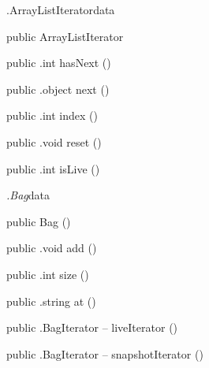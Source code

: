 \begin{CrexxClass}{.ArrayListIterator}{data}

  \begin{Hierarchy}
  \end{Hierarchy}

  \begin{Members}

    \Factory
      {public}
      {ArrayListIterator}
      {}

    \Method
      {public}
      {.int}
      {hasNext}
      {()}

    \Method
      {public}
      {.object}
      {next}
      {()}

    \Method
      {public}
      {.int}
      {index}
      {()}

    \Method
      {public}
      {.void}
      {reset}
      {()}

    \Method
      {public}
      {.int}
      {isLive}
      {()}

  \end{Members}
\end{CrexxClass}

\begin{CrexxClass}{\textit{.Bag}}{data}

  \begin{Hierarchy}
  \end{Hierarchy}

  \begin{Members}

    \Factory
      {public}
      {Bag}
      {()}

    \Method
      {public}
      {.void}
      {add}
      {()}

    \Method
      {public}
      {.int}
      {size}
      {()}

    \Method
      {public}
      {.string}
      {at}
      {()}

    \Method
      {public}
      {.BagIterator}
      {-- liveIterator}
      {()}

    \Method
      {public}
      {.BagIterator}
      {-- snapshotIterator}
      {()}

  \end{Members}
\end{CrexxClass}

